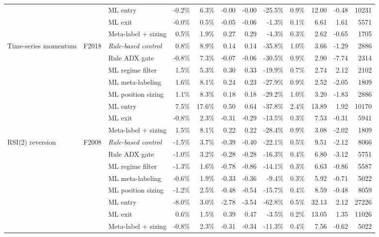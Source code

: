 \begin{longtable}{p{2.2cm} l p{2.6cm} r r r r r r r r r}
 &  & ML entry & -0.2\% & 6.3\% & -0.00 & -0.00 & -25.5\% & 0.9\% & 12.00 & -0.48 & 10231 \\
 &  & ML exit & -0.0\% & 0.5\% & -0.05 & -0.06 & -1.3\% & 0.1\% & 6.61 & 1.61 & 5571 \\
 &  & Meta-label + sizing & 0.5\% & 1.9\% & 0.27 & 0.29 & -4.3\% & 0.3\% & 2.62 & -0.65 & 1705 \\
Time-series momentum & F2018 & \textit{Rule-based control} & 0.8\% & 8.9\% & 0.14 & 0.14 & -35.8\% & 1.0\% & 3.66 & -1.29 & 2886 \\
 &  & Rule ADX gate & -0.8\% & 7.3\% & -0.07 & -0.06 & -30.5\% & 0.9\% & 2.90 & -7.74 & 2314 \\
 &  & ML regime filter & 1.5\% & 5.3\% & 0.30 & 0.33 & -19.9\% & 0.7\% & 2.74 & 2.12 & 2102 \\
 &  & ML meta-labeling & 1.6\% & 8.1\% & 0.24 & 0.23 & -27.9\% & 0.9\% & 2.52 & -2.05 & 1809 \\
 &  & ML position sizing & 1.1\% & 8.3\% & 0.18 & 0.18 & -29.2\% & 1.0\% & 3.20 & -1.83 & 2886 \\
 &  & ML entry & 7.5\% & 17.6\% & 0.50 & 0.64 & -37.8\% & 2.4\% & 13.89 & 1.92 & 10170 \\
 &  & ML exit & -0.8\% & 2.3\% & -0.31 & -0.29 & -13.5\% & 0.3\% & 7.53 & -0.31 & 5941 \\
 &  & Meta-label + sizing & 1.5\% & 8.1\% & 0.22 & 0.22 & -28.4\% & 0.9\% & 3.08 & -2.02 & 1809 \\
RSI(2) reversion & F2008 & \textit{Rule-based control} & -1.5\% & 3.7\% & -0.39 & -0.40 & -22.1\% & 0.5\% & 9.51 & -2.12 & 8066 \\
 &  & Rule ADX gate & -1.0\% & 3.2\% & -0.28 & -0.28 & -16.3\% & 0.4\% & 6.80 & -3.12 & 5751 \\
 &  & ML regime filter & -1.3\% & 1.6\% & -0.78 & -0.86 & -14.1\% & 0.3\% & 6.63 & -0.86 & 5587 \\
 &  & ML meta-labeling & -0.6\% & 1.9\% & -0.33 & -0.36 & -9.4\% & 0.3\% & 5.92 & -0.71 & 5022 \\
 &  & ML position sizing & -1.2\% & 2.5\% & -0.48 & -0.54 & -15.7\% & 0.4\% & 8.59 & -0.48 & 8059 \\
 &  & ML entry & -8.0\% & 3.0\% & -2.78 & -3.54 & -62.8\% & 0.5\% & 32.13 & 2.12 & 27226 \\
 &  & ML exit & 0.6\% & 1.5\% & 0.39 & 0.47 & -3.5\% & 0.2\% & 13.05 & 1.35 & 11026 \\
 &  & Meta-label + sizing & -0.8\% & 2.3\% & -0.31 & -0.34 & -11.3\% & 0.4\% & 7.56 & -0.62 & 5022 \\

\end{longtable}
